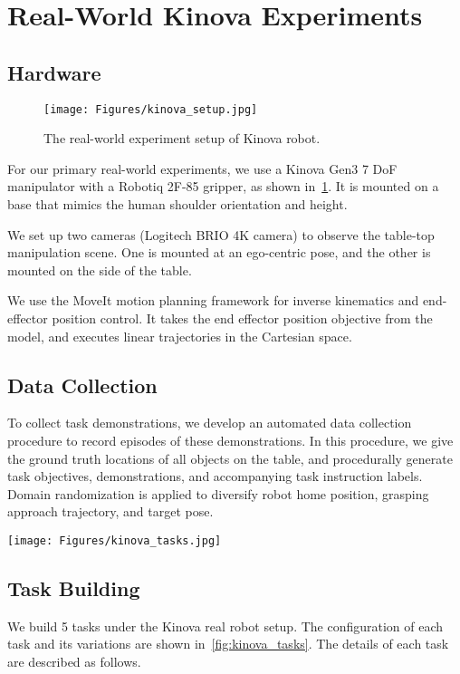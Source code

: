 \section{Real-World Kinova Experiments}
\label{supp:kinova}
\subsection{Hardware}

\begin{figure}[ht!]
    \centering
    \texttt{[image: Figures/kinova\_setup.jpg]}
    \caption{The real-world experiment setup of Kinova robot.}
    \label{fig:kinova_setup}
\end{figure}

For our primary real-world experiments, we use a Kinova Gen3 7 DoF manipulator with a Robotiq 2F-85 gripper, as shown in~\cref{fig:kinova_setup}. It is mounted on a base that mimics the human shoulder orientation and height.

We set up two cameras (Logitech BRIO 4K camera) to observe the table-top manipulation scene. One is mounted at an ego-centric pose, and the other is mounted on the side of the table.

We use the MoveIt motion planning framework for inverse kinematics and end-effector position control. It takes the end effector position objective from the model, and executes linear trajectories in the Cartesian space.

\subsection{Data Collection}

To collect task demonstrations, we develop an automated data collection procedure to record episodes of these demonstrations. In this procedure, we give the ground truth locations of all objects on the table, and procedurally generate task objectives, demonstrations, and accompanying task instruction labels. Domain randomization is applied to diversify robot home position, grasping approach trajectory, and target pose.

\begin{figure*}[ht!]
    \centering
    \texttt{[image: Figures/kinova\_tasks.jpg]}
    \caption{Task building of real-world Kinova setup.}
    \label{fig:kinova_tasks}
\end{figure*}

\subsection{Task Building}
We build 5 tasks under the Kinova real robot setup. The configuration of each task and its variations are shown in~\cref{fig:kinova_tasks}. The details of each task are described as follows.



